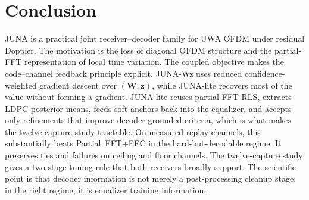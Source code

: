 \documentclass[journal]{IEEEtran}
\newcommand{\juna}{JUNA}
\newcommand{\junalite}{JUNA-lite}
\newcommand{\junawz}{JUNA-Wz}
\begin{document}
\section{Conclusion}\label{sec:conclusion}
\juna{} is a practical joint receiver--decoder family for UWA OFDM under
residual Doppler. The motivation is the loss of diagonal OFDM structure and the
partial-FFT representation of local time variation. The coupled objective makes
the code--channel feedback principle explicit. \junawz{} uses reduced
confidence-weighted gradient descent over $(\mathbf W,\mathbf z)$, while
\junalite{} recovers most of the value without forming a gradient. \junalite{}
reuses partial-FFT RLS, extracts LDPC posterior means, feeds soft anchors back
into the equalizer, and accepts only refinements that improve decoder-grounded
criteria, which is what makes the twelve-capture study tractable. On measured
replay channels, this substantially beats Partial~FFT+FEC in the
hard-but-decodable regime. It preserves ties and failures on ceiling and floor
channels. The twelve-capture study gives a two-stage tuning rule that both
receivers broadly support. The scientific point is that decoder
information is not merely a post-processing cleanup stage: in the right regime,
it is equalizer training information.



\end{document}
